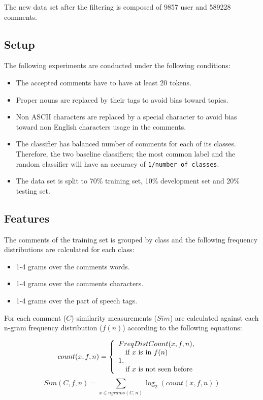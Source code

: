 \documentclass[11pt]{article}
\begin{document}
The new data set after the filtering is composed of 9857 user and 589228 comments.

\subsection{Setup}
The following experiments are conducted under the following conditions:
\begin{itemize}
\item The accepted comments have to have at least 20 tokens.
\item Proper nouns are replaced by their tags to avoid bias toward topics.
\item Non ASCII characters are replaced by a special character to avoid bias toward non English characters usage in the comments.
\item The classifier has balanced number of comments for each of its classes. Therefore, the two baseline classifiers; the most common label and the random classifier will have an accuracy of \verb+1/number of classes+.
\item The data set is split to 70\% training set, 10\% development set and 20\% testing set.
\end{itemize}

\subsection{Features}
The comments of the training set is grouped by class and the following frequency distributions are calculated for each class:
\begin{itemize}
\item 1-4 grams over the comments words.
\item 1-4 grams over the comments characters.
\item 1-4 grams over the part of speech tags.
\end{itemize}

For each comment ($C$) similarity measurements ($Sim$) are calculated against each n-gram frequency distribution ($f(n)$) according to the following equations:

\[
  count(x, f, n) = \left\{ 
  \begin{array}{l l}
    FreqDistCount(x, f, n), & \\\quad \text{if $x$ is in $f(n)$}\\
    1,&\\\quad \text{if $x$ is not seen before}\\
  \end{array} \right.
\]
\[
  Sim(C,f,n) = \sum_{x \in ngrams(C,n)} \log_2 (count(x,f,n))
\]
\end{document}

